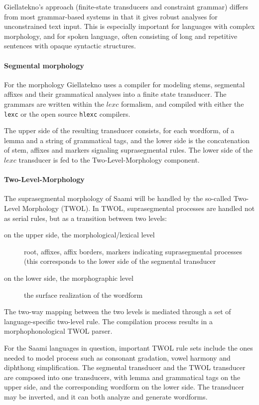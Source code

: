 \documentclass[a4paper,12pt]{article}
\begin{document}
Giellatekno's approach (finite-state transducers and constraint grammar) differs from most grammar-based systems in that it gives robust analyses for unconstrained text input. This is especially important for languages with complex morphology, and for spoken language, often consisting of long and repetitive sentences with opaque syntactic structures.

\paragraph{Segmental morphology}
For the morphology Giellatekno uses a compiler for modeling stems, segmental affixes and their grammatical analyses into a finite state transducer. The grammars are written within the $lexc$ formalism, and compiled with either the \texttt{lexc} or the open source \texttt{hlexc} compilers. 

The upper side of the resulting transducer consists, for each wordform, of a lemma and a string of grammatical tags, and the lower side is the concatenation of stem, affixes and markers signaling suprasegmental rules. The lower side of the $lexc$ transducer is fed to the Two-Level-Morphology component.

\paragraph{Two-Level-Morphology}
The suprasegmental morphology of Saami will be handled by the so-called Two-Level Morphology (TWOL). In TWOL, suprasegmental processes are handled not as serial rules, but as a transition between two levels:
\begin{description}
\item[on the upper side, the morphological/lexical level] root, affixes, affix borders, markers indicating suprasegmental processes (this corresponds to the lower side of the segmental transducer
\item[on the lower side, the morphographic level] the surface realization of the wordform
\end{description}
The two-way mapping between the two levels is mediated through a set of language-specific two-level rule. The compilation process results in a morphophonological TWOL parser.

For the Saami languages in question, important TWOL rule sets include the ones needed to model process such as consonant gradation, vowel harmony and diphthong simplification. The segmental transducer and the TWOL transducer are composed into one transducers, with lemma and grammatical tags on the upper side, and the corresponding wordform on the lower side. The transducer may be inverted, and it can both analyze and generate wordforms.
\end{document}
